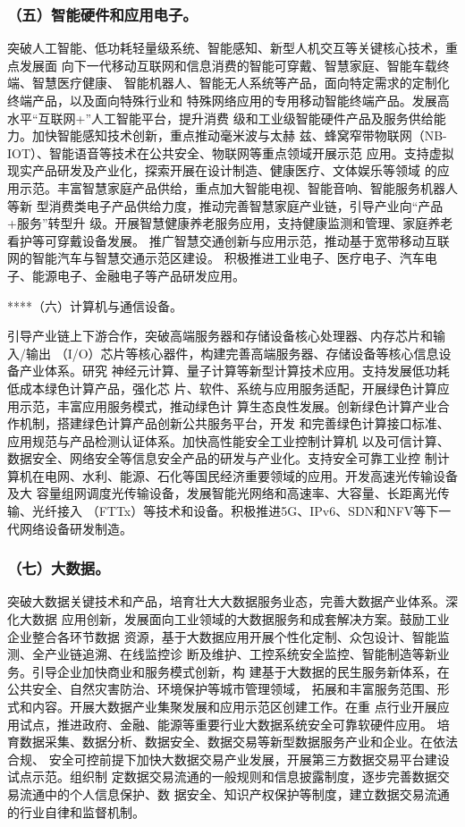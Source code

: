 \documentclass[11pt]{ctexart}
\begin{document}
{{{{\subsubsection{（五）智能硬件和应用电子。}
\label{sec:orgbd29585}

突破人工智能、低功耗轻量级系统、智能感知、新型人机交互等关键核心技术，重点发展面
向下一代移动互联网和信息消费的智能可穿戴、智慧家庭、智能车载终端、智慧医疗健康、
智能机器人、智能无人系统等产品，面向特定需求的定制化终端产品，以及面向特殊行业和
特殊网络应用的专用移动智能终端产品。发展高水平“互联网+”人工智能平台，提升消费
级和工业级智能硬件产品及服务供给能力。加快智能感知技术创新，重点推动毫米波与太赫
兹、蜂窝窄带物联网（NB-IOT）、智能语音等技术在公共安全、物联网等重点领域开展示范
应用。支持虚拟现实产品研发及产业化，探索开展在设计制造、健康医疗、文体娱乐等领域
的应用示范。丰富智慧家庭产品供给，重点加大智能电视、智能音响、智能服务机器人等新
型消费类电子产品供给力度，推动完善智慧家庭产业链，引导产业向“产品+服务”转型升
级。开展智慧健康养老服务应用，支持健康监测和管理、家庭养老看护等可穿戴设备发展。
推广智慧交通创新与应用示范，推动基于宽带移动互联网的智能汽车与智慧交通示范区建设。
积极推进工业电子、医疗电子、汽车电子、能源电子、金融电子等产品研发应用。


****（六）计算机与通信设备。

引导产业链上下游合作，突破高端服务器和存储设备核心处理器、内存芯片和输入/输出
（I/O）芯片等核心器件，构建完善高端服务器、存储设备等核心信息设备产业体系。研究
神经元计算、量子计算等新型计算技术应用。支持发展低功耗低成本绿色计算产品，强化芯
片、软件、系统与应用服务适配，开展绿色计算应用示范，丰富应用服务模式，推动绿色计
算生态良性发展。创新绿色计算产业合作机制，搭建绿色计算产品创新公共服务平台，开发
和完善绿色计算接口标准、应用规范与产品检测认证体系。加快高性能安全工业控制计算机
以及可信计算、数据安全、网络安全等信息安全产品的研发与产业化。支持安全可靠工业控
制计算机在电网、水利、能源、石化等国民经济重要领域的应用。开发高速光传输设备及大
容量组网调度光传输设备，发展智能光网络和高速率、大容量、长距离光传输、光纤接入
（FTTx）等技术和设备。积极推进5G、IPv6、SDN和NFV等下一代网络设备研发制造。

\subsubsection{（七）大数据。}
\label{sec:orgcf89dbc}

突破大数据关键技术和产品，培育壮大大数据服务业态，完善大数据产业体系。深化大数据
应用创新，发展面向工业领域的大数据服务和成套解决方案。鼓励工业企业整合各环节数据
资源，基于大数据应用开展个性化定制、众包设计、智能监测、全产业链追溯、在线监控诊
断及维护、工控系统安全监控、智能制造等新业务。引导企业加快商业和服务模式创新，构
建基于大数据的民生服务新体系，在公共安全、自然灾害防治、环境保护等城市管理领域，
拓展和丰富服务范围、形式和内容。开展大数据产业集聚发展和应用示范区创建工作。在重
点行业开展应用试点，推进政府、金融、能源等重要行业大数据系统安全可靠软硬件应用。
培育数据采集、数据分析、数据安全、数据交易等新型数据服务产业和企业。在依法合规、
安全可控前提下加快大数据交易产业发展，开展第三方数据交易平台建设试点示范。组织制
定数据交易流通的一般规则和信息披露制度，逐步完善数据交易流通中的个人信息保护、数
据安全、知识产权保护等制度，建立数据交易流通的行业自律和监督机制。

}}}}
\end{document}
